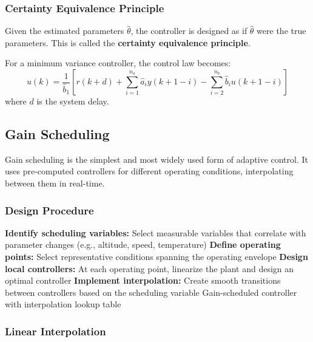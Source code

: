 \subsubsection{Certainty Equivalence Principle}

Given the estimated parameters $\hat{\theta}$, the controller is designed as if $\hat{\theta}$ were the true parameters. This is called the \textbf{certainty equivalence principle}.

For a minimum variance controller, the control law becomes:
\begin{equation}
u(k) = \frac{1}{\hat{b}_1}\left[r(k+d) + \sum_{i=1}^{n_a} \hat{a}_i y(k+1-i) - \sum_{i=2}^{n_b} \hat{b}_i u(k+1-i)\right]
\label{eq:mv_control}
\end{equation}
where $d$ is the system delay.

\subsection{Gain Scheduling}

Gain scheduling is the simplest and most widely used form of adaptive control. It uses pre-computed controllers for different operating conditions, interpolating between them in real-time.

\subsubsection{Design Procedure}

\begin{algorithm}
\caption{Gain Scheduling Design Procedure}
\begin{algorithmic}[1]
\State \textbf{Identify scheduling variables:} Select measurable variables that correlate with parameter changes (e.g., altitude, speed, temperature)
\State \textbf{Define operating points:} Select representative conditions spanning the operating envelope
\State \textbf{Design local controllers:} At each operating point, linearize the plant and design an optimal controller
\State \textbf{Implement interpolation:} Create smooth transitions between controllers based on the scheduling variable
\State \Return Gain-scheduled controller with interpolation lookup table
\end{algorithmic}
\end{algorithm}

\subsubsection{Linear Interpolation}

